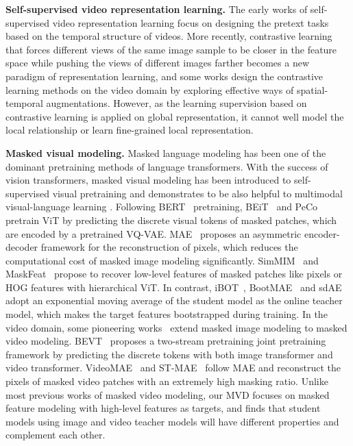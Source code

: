 \documentclass[10pt,twocolumn,letterpaper]{article}
\begin{document}
\vspace{0.05in}
\noindent\textbf{Self-supervised video representation learning.} The early works \cite{wang2015unsupervised,misra2016shuffle,xu2019self,benaim2020speednet} of self-supervised video representation learning focus on designing the pretext tasks based on the temporal structure of videos. More recently, contrastive learning \cite{chen2020simple,he2020momentum,li2021improve} that forces different views of the same image sample to be closer in the feature space while pushing the views of different images farther becomes a new paradigm of representation learning, and some works \cite{ge2021revitalizing,han2020memory,pan2021videomoco,guo2022cross,cvrl,diba2021vi2clr,feichtenhofer2021large} design the contrastive learning methods on the video domain by exploring effective ways of spatial-temporal augmentations. However, as the learning supervision based on contrastive learning is applied on global representation, it cannot well model the local relationship or learn fine-grained local representation.

\vspace{0.05in}
\noindent\textbf{Masked visual modeling.} Masked language modeling \cite{liu2019roberta,devlin2018bert} has been one of the dominant pretraining methods of language transformers. With the success of vision transformers, masked visual modeling \cite{bao2021beit} has been introduced to self-supervised visual pretraining and demonstrates to be also helpful to multimodal visual-language learning \cite{dong2022maskclip,zheng2022general}. Following BERT~\cite{devlin2018bert} pretraining, BEiT~\cite{bao2021beit} and PeCo~\cite{dong2021peco} pretrain ViT by predicting the discrete visual tokens of masked patches, which are encoded by a pretrained VQ-VAE. MAE~\cite{he2021masked} proposes an asymmetric encoder-decoder framework for the reconstruction of pixels, which reduces the computational cost of masked image modeling significantly. SimMIM~\cite{xie2022simmim} and MaskFeat~\cite{maskfeat} propose to recover low-level features of masked patches like pixels or HOG features with hierarchical ViT. In contrast, iBOT~\cite{zhou2021ibot}, BootMAE~\cite{bootmae} and sdAE~\cite{chen2022sdae} adopt an exponential moving average of the student model as the online teacher model, which makes the target features bootstrapped during training. In the video domain, some pioneering works~\cite{tan2021vimpac,wang2022bevt,tong2022videomae,feichtenhofer2022masked} extend masked image modeling to masked video modeling. BEVT~\cite{wang2022bevt} proposes a two-stream pretraining joint pretraining framework by predicting the discrete tokens with both image transformer and video transformer. VideoMAE~\cite{tong2022videomae} and ST-MAE~\cite{feichtenhofer2022masked} follow MAE and reconstruct the pixels of masked video patches with an extremely high masking ratio. Unlike most previous works of masked video modeling, our MVD focuses on masked feature modeling with high-level features as targets, and finds that student models using image and video teacher models will have different properties and complement each other.
\end{document}
